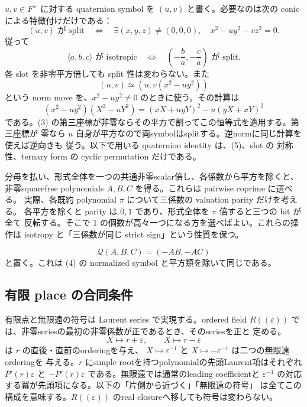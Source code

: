 \documentclass[uplatex,dvipdfmx]{jsarticle}
\theoremstyle{definition}
\theoremstyle{remark}
\begin{document}
$u,v\in F^\times$ に対する quaternion symbol を $(u,v)$ と書く。必要なのは次の
conic による特徴付けだけである：
\[
 (u,v)\text{ が split}
 \quad\Longleftrightarrow\quad
 \exists(x,y,z)\ne(0,0,0),\quad x^2-u y^2-v z^2=0.       \tag{3}
\]
従って
\[
 \langle a,b,c\rangle\text{ が isotropic}
 \quad\Longleftrightarrow\quad
 \left(-\frac ba,-\frac ca\right)\text{ が split}.      \tag{4}
\]
各 slot を非零平方倍しても split 性は変わらない。また
\[
 (u,v)\simeq (u,v(x^2-u y^2))                            \tag{5}
\]
という norm move を、$x^2-u y^2\ne0$ のときに使う。その計算は
\[
 (x^2-u y^2)(X^2-uY^2)
   =(xX+u yY)^2-u(yX+xY)^2
\]
である。(3) の第三座標が非零ならその平方で割ってこの恒等式を適用する。第三座標が
零なら $u$ 自身が平方なので両symbolはsplitする。逆normに同じ計算を使えば逆向きも
従う。以下で用いる quaternion identity は、(5)、slot の
対称性、ternary form の cyclic permutation だけである。

分母を払い、形式全体を一つの共通非零scalar倍し、各係数から平方を除くと、
非零squarefree polynomials $A,B,C$ を得る。これらは pairwise coprime に選べる。
実際、各既約 polynomial $\pi$ について三係数の valuation parity だけを考える。
各平方を除くと parity は $0,1$ であり、形式全体を $\pi$ 倍すると三つの bit が全て
反転する。そこで $1$ の個数が高々一つになる方を選べばよい。これらの操作は
isotropy と「三係数が同じ strict sign」という性質を保つ。

\[
  \mathcal Q(A,B,C)=(-AB,-AC)
\]
と置く。これは (4) の normalized symbol と平方類を除いて同じである。

\subsection{有限 place の合同条件}

有限点と無限遠の符号は Laurent series で実現する。ordered field
$R((\varepsilon))$ では、非零seriesの最初の非零係数が正であるとき、そのseriesを正と
定める。
\[
  X\longmapsto r+\varepsilon,\qquad X\longmapsto r-\varepsilon
\]
は $r$ の直後・直前のorderingを与え、
$X\mapsto\varepsilon^{-1}$ と $X\mapsto-\varepsilon^{-1}$ は二つの無限遠orderingを
与える。$r$ にsimple rootを持つpolynomialの先頭Laurent項はそれぞれ
$P'(r)\varepsilon$ と $-P'(r)\varepsilon$ である。無限遠では通常のleading coefficientと
$\varepsilon^{-1}$ の対応する冪が先頭項になる。以下の「片側から近づく」「無限遠の符号」
は全てこの構成を意味する。$R((\varepsilon))$ のreal closureへ移しても符号は変わらない。
\end{document}
